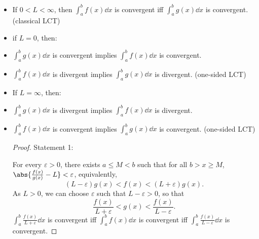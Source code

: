 \documentclass[a4paper,12pt]{report}
\begin{document}
\begin{itemize}
\begin{itemize}
\begin{proof}
Statement 2:

There exists $N\in\bbN$ such that for all $n\geq N$, $0\leq\frac{a_n}{b_n}<1$, equivalently,
\[0\leq a_n<b_n.\]

By direct comparison test of $\sum_{n=N}^{\infty}a_n$ and $\sum_{n=N}^{\infty}b_n$, the statements hold.

Statement 3:

There exists $N\in\bbN$ such that for all $n\geq N$, $\frac{a_n}{b_n}>1$, equivalently,
\[a_n>b_n>0.\]

By direct comparison test of $\sum_{n=N}^{\infty}a_n$ and $\sum_{n=N}^{\infty}b_n$, the statements hold.
\end{proof}
\subsubsection{For improper integral}
If functions $f\colon [a,b)\to\bbR$ and $g\colon [a,b)\to\bbR$ are measurable with $b\in(a,\infty]$, $\int_a^bf(x)\dd{x}$ and $\int_a^bg(x)\dd{x}$ are improper integrals, $\int_a^cf(x)\dd{x}$ and $\int_a^cg(x)\dd{x}$ are proper integrals for any $a<c<b$, $f(x)\geq 0$ and $g(x)>0$ for $x\in[a,b)$, if
\[L=\lim_{x\to b^-}\frac{f(x)}{g(x)}\in[0,\infty],\]
then:
\ben
\item If $0<L<\infty$, then $\int_a^bf(x)\dd{x}$ is convergent iff $\int_a^bg(x)\dd{x}$ is convergent. (classical LCT)
\item if $L=0$, then:
\ben
\item $\int_a^bg(x)\dd{x}$ is convergent implies $\int_a^bf(x)\dd{x}$ is convergent.
\item $\int_a^bf(x)\dd{x}$ is divergent implies $\int_a^bg(x)\dd{x}$ is divergent.
\een
(one-sided LCT)
\item If $L=\infty$, then:
\ben
\item $\int_a^bg(x)\dd{x}$ is divergent implies $\int_a^bf(x)\dd{x}$ is divergent.
\item $\int_a^bf(x)\dd{x}$ is convergent implies $\int_a^bg(x)\dd{x}$ is convergent.
\een
(one-sided LCT)
\een
\begin{proof}
Statement 1:

For every $\varepsilon>0$, there exists $a\leq M<b$ such that for all $b>x\geq M$, $\abs{\frac{f(x)}{g(x)}-L}<\varepsilon$, equivalently,
\[(L-\varepsilon)g(x)<f(x)<(L+\varepsilon)g(x).\]
As $L>0$, we can choose $\varepsilon$ such that $L-\varepsilon>0$, so that
\[\frac{f(x)}{L+\varepsilon}<g(x)<\frac{f(x)}{L-\varepsilon}.\]
$\int_a^b\frac{f(x)}{L+\varepsilon}\dd{x}$ is convergent iff $\int_a^bf(x)\dd{x}$ is convergent iff $\int_a^b\frac{f(x)}{L-\varepsilon}\dd{x}$ is convergent.


\end{proof}
\end{itemize}
\end{itemize}
\end{document}
